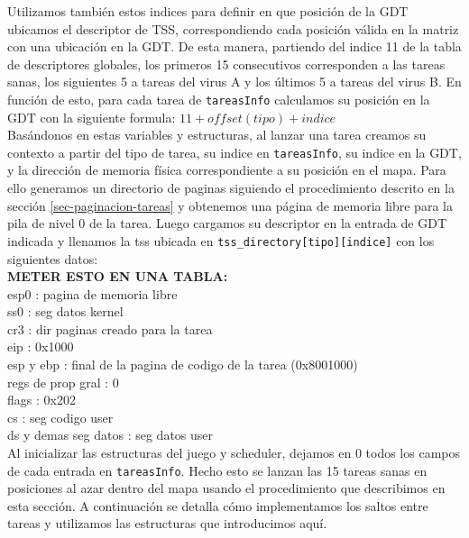 Utilizamos también estos indices para definir en que posición de la GDT ubicamos el descriptor de TSS, correspondiendo cada posición válida en la matriz con una ubicación en la GDT. De esta manera, partiendo del indice 11 de la tabla de descriptores globales, los primeros 15 consecutivos corresponden a las tareas sanas, los siguientes 5 a tareas del virus A y los últimos 5 a tareas del virus B.
En función de esto, para cada tarea de \verb|tareasInfo| calculamos su posición en la GDT con la siguiente formula: $ 11 + offset(tipo) + indice$\\


Basándonos en estas variables y estructuras, al lanzar una tarea creamos su contexto a partir del tipo de tarea, su indice en \verb|tareasInfo|, su indice en la GDT, y la dirección de memoria física correspondiente a su posición en el mapa. 
Para ello generamos un directorio de paginas siguiendo el procedimiento descrito en la sección \ref{sec-paginacion-tareas} y obtenemos una página de memoria libre para la pila de nivel 0 de la tarea. Luego cargamos su descriptor en la entrada de GDT indicada y llenamos la tss ubicada en \verb|tss_directory[tipo][indice]| con los siguientes datos:\\

\textbf{METER ESTO EN UNA TABLA:}\\
esp0 : pagina de memoria libre\\
ss0  : seg datos kernel\\
cr3  : dir paginas creado para la tarea\\
eip  : 0x1000\\
esp y ebp : final de la pagina de codigo de la tarea (0x8001000)\\
regs de prop gral : 0\\
flags : 0x202\\
cs : seg codigo user\\
ds y demas seg datos : seg datos user\\


Al inicializar las estructuras del juego y scheduler, dejamos en 0 todos los campos de cada entrada en \verb|tareasInfo|. Hecho esto se lanzan las 15 tareas sanas en posiciones al azar dentro del mapa usando el procedimiento que describimos en esta sección. A continuación se detalla cómo implementamos los saltos entre tareas y utilizamos las estructuras que introducimos aquí.






